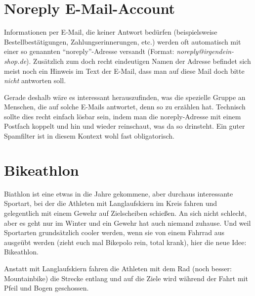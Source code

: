 \documentclass[a5paper,pagesize,10pt,bibtotoc,pointlessnumbers,normalheadings,DIV=9,twoside=false]{scrbook}
\begin{document}


\chapter{Noreply E-Mail-Account}

Informationen per E-Mail, die keiner Antwort bedürfen (beispielsweise Bestellbestätigungen, Zahlungserinnerungen, etc.) werden oft automatisch mit einer so genannten ``noreply''-Adresse versandt (Format: \emph{noreply@irgendein-shop.de}).
Zusätzlich zum doch recht eindeutigen Namen der Adresse befindet sich meist noch ein Hinweis im Text der E-Mail, dass man auf diese Mail doch bitte \emph{nicht} antworten soll.

Gerade deshalb wäre es interessant herauszufinden, was die spezielle Gruppe an Menschen, die auf solche E-Mails antwortet, denn so zu erzählen hat.
Technisch sollte dies recht einfach lösbar sein, indem man die noreply-Adresse mit einem Postfach koppelt und hin und wieder reinschaut, was da so drinsteht.
Ein guter Spamfilter ist in diesem Kontext wohl fast obligatorisch. 

\chapter{Bikeathlon}

Biathlon ist eine etwas in die Jahre gekommene, aber durchaus interessante Sportart, bei der die Athleten mit Langlaufskiern im Kreis fahren und gelegentlich mit einem Gewehr auf Zielscheiben schießen.
An sich nicht schlecht, aber es geht nur im Winter und ein Gewehr hat auch niemand zuhause.
Und weil Sportarten grundsätzlich cooler werden, wenn sie von einem Fahrrad aus ausgeübt werden (zieht euch mal Bikepolo rein, total krank), hier die neue Idee: Bikeathlon.

Anstatt mit Langlaufskiern fahren die Athleten mit dem Rad (noch besser: Mountainbike) die Strecke entlang und auf die Ziele wird während der Fahrt mit Pfeil und Bogen geschossen.

\end{document}
